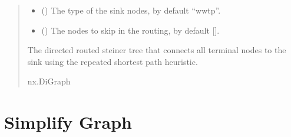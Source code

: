 \documentclass[letterpaper,10pt,english]{sphinxmanual}
\begin{document}
\begin{fulllineitems}
\begin{quote}
\begin{description}
\begin{itemize}
\item {} 
\sphinxAtStartPar
{} (\sphinxstyleliteralemphasis{\sphinxupquote{, }}) \textendash{} The type of the sink nodes, by default “wwtp”.

\item {} 
\sphinxAtStartPar
{} (\sphinxstyleliteralemphasis{\sphinxupquote{{[}}}\sphinxstyleliteralemphasis{\sphinxupquote{{]}}}\sphinxstyleliteralemphasis{\sphinxupquote{, }}) \textendash{} The nodes to skip in the routing, by default {[}{]}.

\end{itemize}

\sphinxAtStartPar
The directed routed steiner tree that connects all terminal nodes to the sink using the repeated shortest path heuristic.

\sphinxAtStartPar
nx.DiGraph

\end{description}\end{quote}

\end{fulllineitems}



\section{Simplify Graph}
\label{\detokenize{pysewer:module-pysewer.simplify}}\label{\detokenize{pysewer:simplify-graph}}
\end{document}
